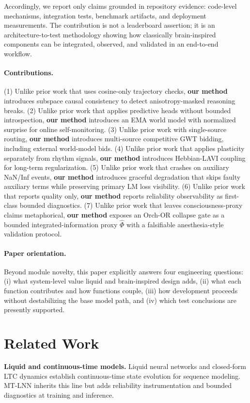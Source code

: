 \documentclass[10pt,twocolumn]{article}
\begin{document}
Accordingly, we report only claims grounded in repository evidence: code-level mechanisms, integration tests, benchmark artifacts, and deployment measurements. The contribution is not a leaderboard assertion; it is an architecture-to-test methodology showing how classically brain-inspired components can be integrated, observed, and validated in an end-to-end workflow.

\paragraph{Contributions.}
(1) Unlike prior work that uses cosine-only trajectory checks, \textbf{our method} introduces subspace causal consistency to detect anisotropy-masked reasoning breaks. 
(2) Unlike prior work that applies predictive heads without bounded introspection, \textbf{our method} introduces an EMA world model with normalized surprise for online self-monitoring. 
(3) Unlike prior work with single-source routing, \textbf{our method} introduces multi-source competitive GWT bidding, including external world-model bids. 
(4) Unlike prior work that applies plasticity separately from rhythm signals, \textbf{our method} introduces Hebbian-LAVI coupling for long-term regularization. 
(5) Unlike prior work that crashes on auxiliary NaN/Inf events, \textbf{our method} introduces graceful degradation that skips faulty auxiliary terms while preserving primary LM loss visibility. 
(6) Unlike prior work that reports quality only, \textbf{our method} reports reliability observability as first-class bounded diagnostics.
(7) Unlike prior work that leaves consciousness-proxy claims metaphorical, \textbf{our method} exposes an Orch-OR collapse gate as a bounded integrated-information proxy $\hat{\Phi}$ with a falsifiable anesthesia-style validation protocol.

\paragraph{Paper orientation.}
Beyond module novelty, this paper explicitly answers four engineering questions: (i) what system-level value liquid and brain-inspired design adds, (ii) what each function contributes and how functions couple, (iii) how development proceeds without destabilizing the base model path, and (iv) which test conclusions are presently supported.

\section{Related Work}
\textbf{Liquid and continuous-time models.} Liquid neural networks and closed-form LTC dynamics establish continuous-time state evolution for sequence modeling. MT-LNN inherits this line but adds reliability instrumentation and bounded diagnostics at training and inference. 
\end{document}
